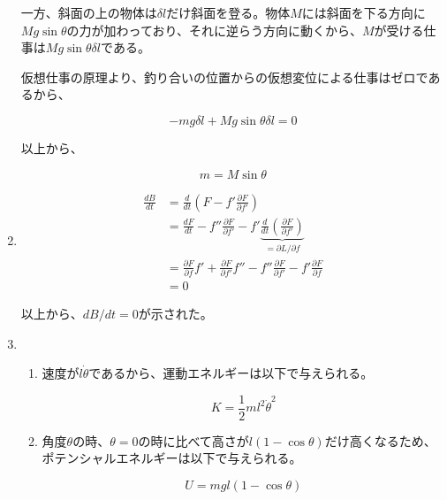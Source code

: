\documentclass{jsarticle}
\begin{document}
\begin{enumerate}
        一方、斜面の上の物体は$\delta l$だけ斜面を登る。物体$M$には斜面を下る方向に$Mg \sin \theta$の力が加わっており、それに逆らう方向に動くから、$M$が受ける仕事は$Mg \sin \theta \delta l$である。

        仮想仕事の原理より、釣り合いの位置からの仮想変位による仕事はゼロであるから、

        $$
          -mg \delta l + Mg \sin \theta \delta l = 0
        $$

        以上から、

        $$
          m = M\sin \theta
        $$
  \item
        $$
          \begin{aligned}
            \frac{dB}{dt} & = \frac{d}{dt} \left( F - f' \frac{\partial F}{\partial f'}\right)                  \\
                          & = \frac{dF}{dt} - f'' \frac{\partial F}{\partial f'}
            -  f' \underbrace{\frac{d}{dt}\left(\frac{\partial F}{\partial f'}\right)}_{=\partial L/\partial f} \\
                          & = \frac{\partial F}{\partial f}f' + \frac{\partial F}{\partial f'}f''
            - f'' \frac{\partial F}{\partial f'} - f' \frac{\partial F}{\partial f}                             \\
                          & = 0
          \end{aligned}
        $$

        以上から、$dB/dt = 0$が示された。
  \item
        \begin{enumerate}
          \item 速度が$l\dot{\theta}$であるから、運動エネルギーは以下で与えられる。

                $$
                  K= \frac{1}{2}m l^2 \dot{\theta}^2
                $$
          \item 角度$\theta$の時、$\theta=0$の時に比べて高さが$l(1-\cos\theta)$だけ高くなるため、ポテンシャルエネルギーは以下で与えられる。

                $$
                  U = mgl (1- \cos \theta)
                $$


\end{enumerate}
\end{enumerate}
\end{document}
